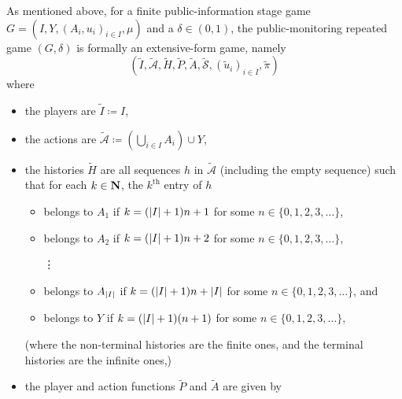 \begin{remark}
	\label{remark:rep_game_formal}
	As mentioned above, for a finite public-information stage game $G = \left( I, Y, (A_i, u_i)_{i \in I}, \mu \right)$ and a $\delta \in (0,1)$, the public-monitoring repeated game $(G,\delta)$ is formally an extensive-form game, namely
	\begin{equation*}
		\left(\widetilde{I},\widetilde{\mathcal{A}},\widetilde{H},\widetilde{P},\widetilde{A},\widetilde{\mathcal{S}},\left(\widetilde{u}_i\right)_{i \in I},\widetilde{\pi}\right)
	\end{equation*}
	where
	\begin{itemize}
	
		\item the players are $\widetilde{I} \coloneqq I$,
		
		\item the actions are $\widetilde{\mathcal{A}} \coloneqq \left( \bigcup_{i \in I} A_i \right) \cup Y$,

		\item the histories $\widetilde{H}$ are all sequences $h$ in $\widetilde{\mathcal{A}}$ (including the empty sequence) such that for each $k \in \mathbf{N}$, the $k^\text{th}$ entry of $h$

		\begin{itemize}
		
			\item belongs to $A_1$ if $k = (\abs*{I}+1) n + 1$ for some $n \in \{0,1,2,3,\dots\}$,

			\item belongs to $A_2$ if $k = (\abs*{I}+1) n + 2$ for some $n \in \{0,1,2,3,\dots\}$,

			\item[\vdots]

			\item belongs to $A_{\abs*{I}}$ if $k = (\abs*{I}+1) n + \abs*{I}$ for some $n \in \{0,1,2,3,\dots\}$, and

			\item belongs to $Y$ if $k = (\abs*{I}+1) (n+1)$ for some $n \in \{0,1,2,3,\dots\}$,
		
		\end{itemize}
		(where the non-terminal histories are the finite ones, and the terminal histories are the infinite ones,)

		\item the player and action functions $\widetilde{P}$ and $\widetilde{A}$ are given by


\end{itemize}
\end{remark}
